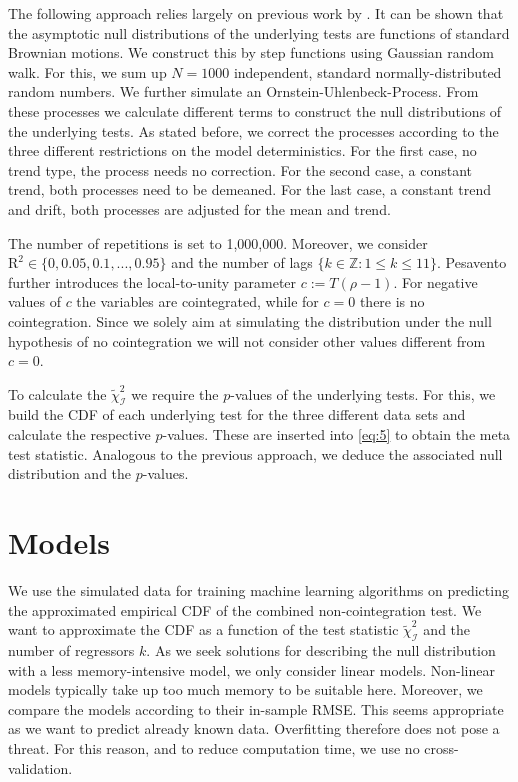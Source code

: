 \documentclass[12pt,a4paper]{article}
\begin{document}
The following approach relies largely on previous work by
\textcite{Pesavento_2004}. It can be shown that the asymptotic null
distributions of the underlying tests are functions of standard Brownian
motions. We construct this by step functions using Gaussian random walk.
For this, we sum up \(N = 1000\) independent, standard
normally-distributed random numbers. We further simulate an
Ornstein-Uhlenbeck-Process. From these processes we calculate different
terms to construct the null distributions of the underlying tests. As
stated before, we correct the processes according to the three different
restrictions on the model deterministics. For the first case, no trend
type, the process needs no correction. For the second case, a constant
trend, both processes need to be demeaned. For the last case, a constant
trend and drift, both processes are adjusted for the mean and trend.

The number of repetitions is set to 1,000,000. Moreover, we consider
\(\text{R}^2 \in \{0, 0.05, 0.1, ..., 0.95\}\) and the number of lags
\(\{k \in \mathbb{Z}: 1 \leq k \leq 11\}\). Pesavento further introduces
the local-to-unity parameter \(c:= T(\rho-1)\). For negative values of
\(c\) the variables are cointegrated, while for \(c = 0\) there is no
cointegration. Since we solely aim at simulating the distribution under
the null hypothesis of no cointegration we will not consider other
values different from \(c = 0\).

To calculate the \(\tilde{\chi}^2_{\mathcal{I}}\) we require the
\(p\)-values of the underlying tests. For this, we build the \ac{CDF} of
each underlying test for the three different data sets and calculate the
respective \(p\)-values. These are inserted into \eqref{eq:5} to obtain
the meta test statistic. Analogous to the previous approach, we deduce
the associated null distribution and the \(p\)-values.

\hypertarget{models}{%
\section{Models}\label{models}}

We use the simulated data for training machine learning algorithms on
predicting the approximated empirical \ac{CDF} of the combined
non-cointegration test. We want to approximate the \ac{CDF} as a
function of the test statistic \(\tilde{\chi}^2_{\mathcal{I}}\) and the
number of regressors \(k\). As we seek solutions for describing the null
distribution with a less memory-intensive model, we only consider linear
models. Non-linear models typically take up too much memory to be
suitable here. Moreover, we compare the models according to their
in-sample \ac{RMSE}. This seems appropriate as we want to predict
already known data. Overfitting therefore does not pose a threat. For
this reason, and to reduce computation time, we use no cross-validation.
\end{document}
